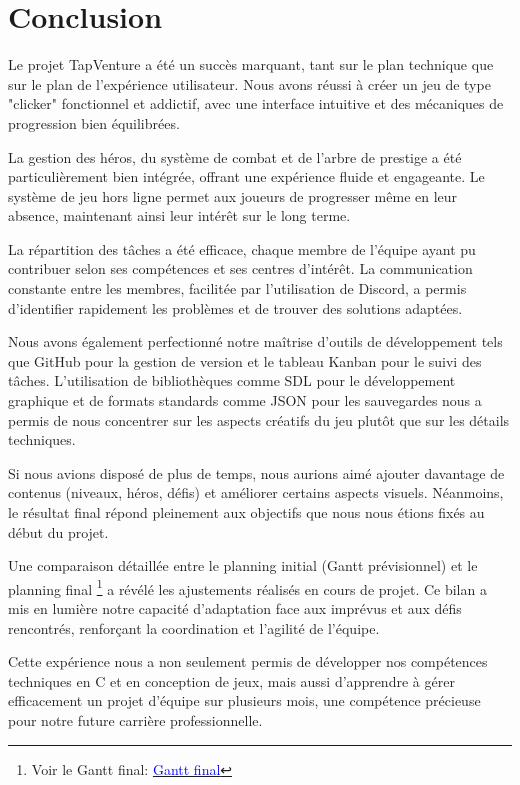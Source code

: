 \documentclass[11pt,a4paper]{article}
\begin{document}
\section{Conclusion}

Le projet TapVenture a été un succès marquant, tant sur le plan technique que sur le plan de l'expérience utilisateur. Nous avons réussi à créer un jeu de type "clicker" fonctionnel et addictif, avec une interface intuitive et des mécaniques de progression bien équilibrées.

La gestion des héros, du système de combat et de l'arbre de prestige a été particulièrement bien intégrée, offrant une expérience fluide et engageante. Le système de jeu hors ligne permet aux joueurs de progresser même en leur absence, maintenant ainsi leur intérêt sur le long terme.

La répartition des tâches a été efficace, chaque membre de l'équipe ayant pu contribuer selon ses compétences et ses centres d'intérêt. La communication constante entre les membres, facilitée par l'utilisation de Discord, a permis d'identifier rapidement les problèmes et de trouver des solutions adaptées.

Nous avons également perfectionné notre maîtrise d'outils de développement tels que GitHub pour la gestion de version et le tableau Kanban pour le suivi des tâches. L'utilisation de bibliothèques comme SDL pour le développement graphique et de formats standards comme JSON pour les sauvegardes nous a permis de nous concentrer sur les aspects créatifs du jeu plutôt que sur les détails techniques.

Si nous avions disposé de plus de temps, nous aurions aimé ajouter davantage de contenus (niveaux, héros, défis) et améliorer certains aspects visuels. Néanmoins, le résultat final répond pleinement aux objectifs que nous nous étions fixés au début du projet.

Une comparaison détaillée entre le planning initial (Gantt prévisionnel) et le planning final \footnote{Voir le Gantt final: \href{https://docs.google.com/spreadsheets/d/1g_aXH0iCGiOk6sKCY968UDUnUj0G5DKaRImCl4IrqMM/edit?usp=sharing}{\textcolor{blue}{Gantt final}}} a révélé les ajustements réalisés en cours de projet. Ce bilan a mis en lumière notre capacité d'adaptation face aux imprévus et aux défis rencontrés, renforçant la coordination et l'agilité de l'équipe.

Cette expérience nous a non seulement permis de développer nos compétences techniques en C et en conception de jeux, mais aussi d'apprendre à gérer efficacement un projet d'équipe sur plusieurs mois, une compétence précieuse pour notre future carrière professionnelle.
\end{document}
